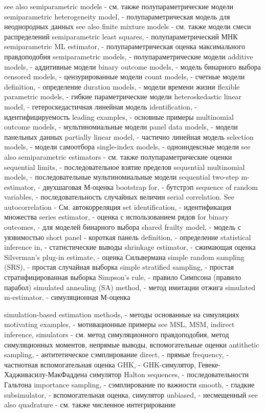 see also semiparametric models - см. также полупараметрические модели
semiparametric heterogeneity model, - полупараметрическая модель для неоднородных данных
see also finite mixture models - см. также модели смеси распределений
semiparametric least squares, - полупараметрический МНК
semiparametric ML estimator, - полупараметрическая оценка максимального правдоподобия
semiparametric models, - полупараметрические модели
additive models, - аддитивные модели
binary outcome models, - модель бинарного выбора
censored models, - цензурированные модели
count models, - счетные модели
definition, - определение
duration models, - модели времени жизни
flexible parametric models, - гибкие параметрические модели
heteroskedastic linear model, - гетероскедастичная линейная модель
identification, - идентифицируемость
leading examples, - основные примеры
multinomial outcome models, - мультиномиальные модели
panel data models, - модели панельных данных
partially linear model, - частично линейная модель
selection models, - модели самоотбора
single-index models, - одноиндексные модели
see also semiparametric estimators - см. также полупараметрические оценки
sequential limits, - последовательное взятие пределов
sequential multinomial models, - последовательные мультиномиальные модели
sequential two-step m-estimator, - двухшаговая М-оценка
bootstrap for, - бутстрэп
sequence of random variables, - последовательность случайных величин
serial correlation. See autocorrelation - См. автокорреляция
set identification, - идентификация множества
series estimator, - оценка с использованием рядов
for binary outcomes, - для моделей бинарного выбора
shared frailty model, - модель с уязвимостью
short panel - короткая панель
definition, - определение
statistical inference in, - статистические выводы
shrinkage estimator, - сжимающая оценка
Silverman’s plug-in estimate, - оценка Сильвермана
simple random sampling (SRS), - простая случайная выборка
simple stratified sampling, - простая стратифицированная выборка
Simpson’s rule, - правило Симпсона (правило парабол)
simulated annealing (SA) method, - метод имитации отжига
simulated m-estimator, - симуляционная М-оценка

simulation-based estimation methods, - методы основанные на симуляциях
motivating examples, - мотивационные примеры
see MSL, MSM, indirect inference, simulators  - см. метод симуляционного правдоподобия, метод симуляционных моментов, непрямые выводы, вспомогательные оценки
antithetic sampling, - антитетическое сэмплирование
direct, - прямые
frequency, - частнотная вспомогательная оценка
GHK, - GHK-симулятор, Гевеке-Хадживасилу-МакФаддена симулятор
Halton sequences, - последовательности Гальтона
importance sampling, - сэмплирование по важности
smooth, - гладкие
subsimulator, - вспомогательная оценка, симулятор
unbiased, - несмещенный
see also quadrature - см. также численное интегрирование

